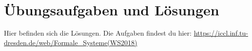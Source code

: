 
\chapter{Übungsaufgaben und Lösungen}
Hier befinden sich  die Lösungen.
Die Aufgaben findest du hier:
\url{https://iccl.inf.tu-dresden.de/web/Formale_Systeme(WS2018)}













